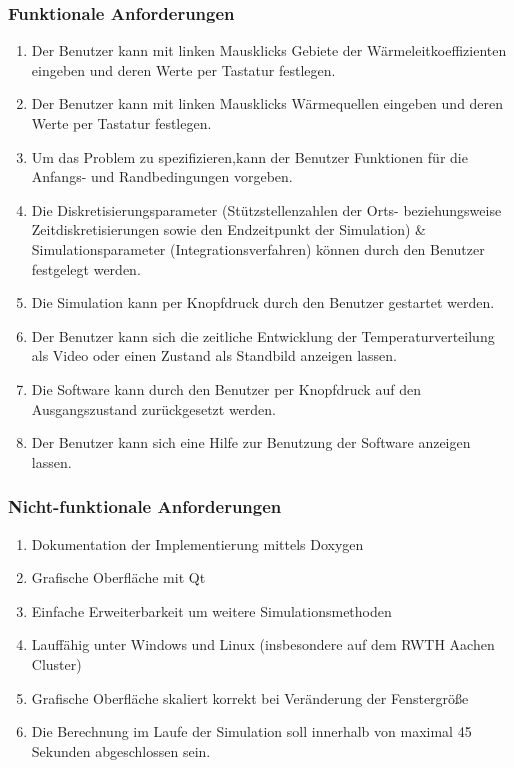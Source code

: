 \subsubsection*{Funktionale Anforderungen}

\begin{enumerate}
	\item Der Benutzer kann mit linken Mausklicks Gebiete der Wärmeleitkoeffizienten eingeben und deren Werte per Tastatur festlegen.
	\item Der Benutzer kann mit linken Mausklicks Wärmequellen eingeben und deren Werte per Tastatur festlegen.
	\item Um das Problem zu spezifizieren,kann der Benutzer Funktionen für die Anfangs- und Randbedingungen vorgeben.
	\item Die Diskretisierungsparameter (Stützstellenzahlen der Orts- beziehungsweise Zeitdiskretisierungen sowie den Endzeitpunkt der Simulation) \& Simulationsparameter (Integrationsverfahren) können durch den Benutzer festgelegt werden.
	\item Die Simulation kann per Knopfdruck durch den Benutzer gestartet werden.
	\item Der Benutzer kann sich die zeitliche Entwicklung der Temperaturverteilung als Video oder einen Zustand als Standbild anzeigen lassen.
	\item Die Software kann durch den Benutzer per Knopfdruck auf den Ausgangszustand zurückgesetzt werden.
	\item Der Benutzer kann sich eine Hilfe zur Benutzung der Software anzeigen lassen.
\end{enumerate}

\subsubsection*{Nicht-funktionale Anforderungen}

\begin{enumerate}
	\item Dokumentation der Implementierung mittels Doxygen
	\item Grafische Oberfläche mit Qt
	\item Einfache Erweiterbarkeit um weitere Simulationsmethoden
	\item Lauffähig unter Windows und Linux (insbesondere auf dem RWTH Aachen Cluster)
	\item Grafische Oberfläche skaliert korrekt bei Veränderung der Fenstergröße
	\item Die Berechnung im Laufe der Simulation soll innerhalb von maximal 45 Sekunden abgeschlossen sein.
\end{enumerate}


